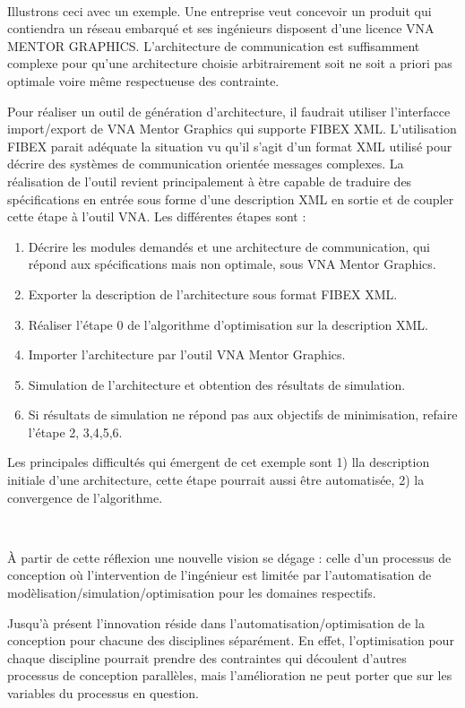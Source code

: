 \documentclass[11pt]{article}
\begin{document}
~

Illustrons ceci avec un exemple. Une entreprise veut concevoir un produit qui contiendra un réseau embarqué et ses ingénieurs disposent d'une licence VNA MENTOR GRAPHICS. L'architecture de communication est suffisamment complexe pour qu'une architecture choisie arbitrairement soit ne soit a priori pas optimale voire même respectueuse des contrainte.

Pour réaliser un outil de génération d’architecture, il faudrait utiliser l’interfacce import/export de VNA Mentor Graphics qui supporte FIBEX XML. L’utilisation FIBEX parait adéquate la situation vu qu’il s’agit d’un format XML utilisé pour décrire des systèmes de communication orientée messages complexes. La réalisation de l’outil revient principalement à ètre capable de traduire des spécifications en entrée sous forme d’une description XML en sortie et de coupler cette étape à l’outil VNA. Les différentes étapes sont :
\begin{enumerate}
\item Décrire les modules demandés et une architecture de communication, qui répond aux spécifications mais non optimale, sous VNA Mentor Graphics. 
\item Exporter la description de l’architecture sous format FIBEX XML.
\item Réaliser l’étape 0 de l’algorithme d’optimisation sur la description XML.
\item Importer l’architecture par l’outil VNA Mentor Graphics.
\item Simulation de l’architecture et obtention des résultats de simulation.
\item Si résultats de simulation ne répond pas aux objectifs de minimisation, refaire l’étape 2, 3,4,5,6.
\end{enumerate}

Les principales difficultés qui émergent de cet  exemple sont 1) lla description initiale d'une architecture, cette étape pourrait aussi être automatisée, 2) la convergence de l'algorithme.

~

\`A partir de cette réflexion une nouvelle vision se dégage : celle d'un processus de conception où l'intervention de l'ingénieur est limitée par l'automatisation de modèlisation/simulation/optimisation pour les domaines respectifs.

Jusqu'à présent l'innovation réside dans l'automatisation/optimisation de la conception pour chacune des disciplines séparément. En effet, l'optimisation pour chaque discipline pourrait prendre des contraintes qui découlent d'autres processus de conception parallèles, mais l'amélioration ne peut porter que sur les variables du processus en question.  
\end{document}
